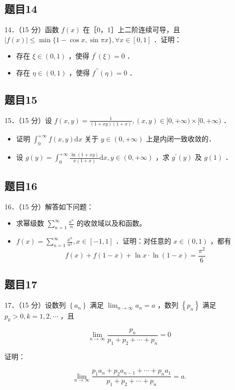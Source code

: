 \documentclass{article}
\begin{document}
\subsection{题目14}
14．（15 分）函数 \(f(x)\) 在［0，1］上二阶连续可导，且 \(|f(x)| \leq \min \{1-\cos x, \sin \pi x\}, \forall x \in[0,1]\) ．证明：

\begin{itemize}
  \item[（1）] 存在 \(\xi \in(0,1)\) ，使得 \(f^{\prime}(\xi)=0\) ．
  \item[（2）] 存在 \(\eta \in(0,1)\) ，使得 \(f^{\prime \prime}(\eta)=0\) ．
\end{itemize}

\subsection{题目15}
15．（15 分）设 \(f(x, y)=\frac{1}{(1+x y)(1+x)},(x, y) \in[0,+\infty) \times[0,+\infty)\) ．

\begin{itemize}
  \item[（1）] 证明 \(\int_{0}^{+\infty} f(x, y) \mathrm{d} x\) 关于 \(y \in(0,+\infty)\) 上是内闭一致收敛的．
  \item[（2）] 设 \(g(y)=\int_{0}^{+\infty} \frac{\ln (1+x y)}{x(1+x)} \mathrm{d} x, y \in(0,+\infty)\) ，求 \(g^{\prime}(y)\) 及 \(g(1)\) ．
\end{itemize}

\subsection{题目16}
16．（15 分）解答如下问题：

\begin{itemize}
  \item[（1）] 求幂级数 \(\sum_{n=1}^{\infty} \frac{x^{n}}{n}\) 的收敛域以及和函数。
  \item[（2）] \(f(x)=\sum_{n=1}^{\infty} \frac{x^{n}}{n^{2}}, x \in[-1,1]\) ．证明：对任意的 \(x \in(0,1)\) ，都有
\[
f(x)+f(1-x)+\ln x \cdot \ln (1-x)=\frac{\pi^{2}}{6}
\]
\end{itemize}

\subsection{题目17}
17．（15 分）设数列 \(\left\{a_{n}\right\}\) 满足 \(\lim _{n \rightarrow \infty} a_{n}=a\) ，数列 \(\left\{p_{n}\right\}\) 满足 \(p_{k}>0, k=1,2, \cdots\) ，且

\[
\lim _{n \rightarrow \infty} \frac{p_{n}}{p_{1}+p_{2}+\cdots+p_{n}}=0
\]

证明：

\[
\lim _{n \rightarrow \infty} \frac{p_{1} a_{n}+p_{2} a_{n-1}+\cdots+p_{n} a_{1}}{p_{1}+p_{2}+\cdots+p_{n}}=a .
\]
\end{document}
